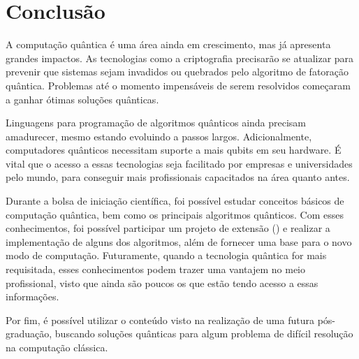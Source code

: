 \chapter{Conclusão}\label{ch:conclusao}

A computação quântica é uma área ainda em crescimento, mas já apresenta grandes impactos.
As tecnologias como a criptografia precisarão se atualizar para prevenir que sistemas sejam invadidos ou quebrados pelo algoritmo de fatoração quântica.
Problemas até o momento impensáveis de serem resolvidos começaram a ganhar ótimas soluções quânticas.

Linguagens para programação de algoritmos quânticos ainda precisam amadurecer, mesmo estando evoluindo a passos largos.
Adicionalmente, computadores quânticos necessitam suporte a mais qubits em seu hardware.
É vital que o acesso a essas tecnologias seja facilitado por empresas e universidades pelo mundo, para conseguir mais profissionais capacitados na área quanto antes.

Durante a bolsa de iniciação científica, foi possível estudar conceitos básicos de computação quântica, bem como os principais algoritmos quânticos.
Com esses conhecimentos, foi possível participar um projeto de extensão () e realizar a implementação de alguns dos algoritmos, além de fornecer uma base para o novo modo de computação.
Futuramente, quando a tecnologia quântica for mais requisitada, esses conhecimentos podem trazer uma vantajem no meio profissional, visto que ainda são poucos os que estão tendo acesso a essas informações.

Por fim, é possível utilizar o conteúdo visto na realização de uma futura pós-graduação, buscando soluções quânticas para algum problema de difícil resolução na computação clássica.